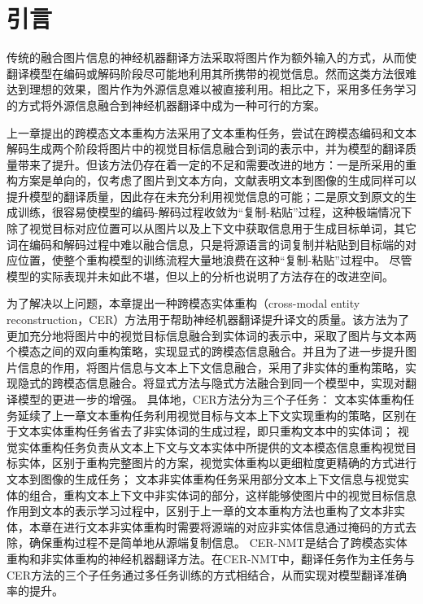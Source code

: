 \section{引言}
传统的融合图片信息的神经机器翻译方法采取将图片作为额外输入的方式，从而使翻译模型在编码或解码阶段尽可能地利用其所携带的视觉信息。然而这类方法很难达到理想的效果，图片作为外源信息难以被直接利用。相比之下，采用多任务学习的方式将外源信息融合到神经机器翻译中成为一种可行的方案\cite{49_wang-zhang-2022-addressing,50_kang_zong_2022}。


上一章提出的跨模态文本重构方法采用了文本重构任务，尝试在跨模态编码和文本解码生成两个阶段将图片中的视觉目标信息融合到词的表示中，并为模型的翻译质量带来了提升。但该方法仍存在着一定的不足和需要改进的地方：一是所采用的重构方案是单向的，仅考虑了图片到文本方向，文献\cite{37_elliott-kadar-2017-imagination}表明文本到图像的生成同样可以提升模型的翻译质量，因此存在未充分利用视觉信息的可能；二是原文到原文的生成训练，很容易使模型的编码-解码过程收敛为“复制-粘贴”过程，这种极端情况下除了视觉目标对应位置可以从图片以及上下文中获取信息用于生成目标单词，其它词在编码和解码过程中难以融合信息，只是将源语言的词复制并粘贴到目标端的对应位置，使整个重构模型的训练流程大量地浪费在这种“复制-粘贴”过程中。
尽管模型的实际表现并未如此不堪，但以上的分析也说明了方法存在的改进空间。

为了解决以上问题，本章提出一种跨模态实体重构（cross-modal entity reconstruction，CER）方法用于帮助神经机器翻译提升译文的质量。该方法为了更加充分地将图片中的视觉目标信息融合到实体词的表示中，采取了图片与文本两个模态之间的双向重构策略，实现显式的跨模态信息融合。并且为了进一步提升图片信息的作用，将图片信息与文本上下文信息融合，采用了非实体的重构策略，实现隐式的跨模态信息融合。将显式方法与隐式方法融合到同一个模型中，实现对翻译模型的更进一步的增强。
具体地，CER方法分为三个子任务：
文本实体重构任务延续了上一章文本重构任务利用视觉目标与文本上下文实现重构的策略，区别在于文本实体重构任务省去了非实体词的生成过程，即只重构文本中的实体词；
视觉实体重构任务负责从文本上下文与文本实体中所提供的文本模态信息重构视觉目标实体，区别于重构完整图片的方案，视觉实体重构以更细粒度更精确的方式进行文本到图像的生成任务；
文本非实体重构任务采用部分文本上下文信息与视觉实体的组合，重构文本上下文中非实体词的部分，这样能够使图片中的视觉目标信息作用到文本的表示学习过程中，区别于上一章的文本重构方法也重构了文本非实体，本章在进行文本非实体重构时需要将源端的对应非实体信息通过掩码的方式去除，确保重构过程不是简单地从源端复制信息。
CER-NMT是结合了跨模态实体重构和非实体重构的神经机器翻译方法。在CER-NMT中，翻译任务作为主任务与CER方法的三个子任务通过多任务训练的方式相结合，从而实现对模型翻译准确率的提升。

